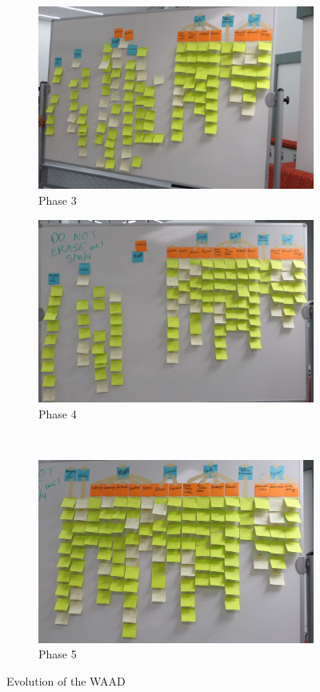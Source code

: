 \documentclass[12pt]{article} %
\begin{document}
\begin{figure}[H]
\begin{subfigure}{.5\linewidth}
      \label{fig:WAAD_version2}
    \end{subfigure}\\[1ex]
    \begin{subfigure}{.5\linewidth}
      \centering
      \includegraphics[width=0.95\linewidth]{WAAD_version3}
      \caption{Phase 3}
      \label{fig:WAAD_version3}
    \end{subfigure}%
    \begin{subfigure}{.5\linewidth}
      \centering
      \includegraphics[width=0.95\linewidth]{WAAD_version4}
      \caption{Phase 4}
      \label{fig:WAAD_version4}
    \end{subfigure}\\[1ex]
    \begin{subfigure}{\linewidth}
      \centering
      \includegraphics[width=0.55\linewidth]{WAAD_version5}
      \caption{Phase 5}
      \label{fig:WAAD_version5}
    \end{subfigure}
    \caption{Evolution of the WAAD}
    \label{fig:WAAD}
  \end{figure}
\end{document}
